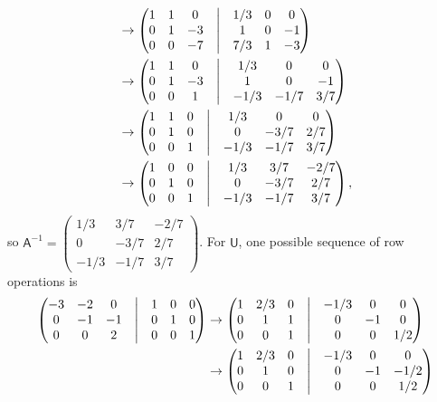 \begin{enumerate}
\begin{enumerate}
\begin{align*}
&\rightarrow \begin{pmatrix} 1 & 1 & 0 & \bigm| & 1/3 & 0 & 0 \\ 0 & 1 & -3 & \bigm| & 1 & 0 & -1 \\ 0 & 0 & -7 & \bigm| & 7/3 & 1 & -3 \end{pmatrix} \\
&\rightarrow \begin{pmatrix} 1 & 1 & 0 & \bigm| & 1/3 & 0 & 0 \\ 0 & 1 & -3 & \bigm| & 1 & 0 & -1 \\ 0 & 0 & 1 & \bigm| & -1/3 & -1/7 & 3/7 \end{pmatrix} \\
&\rightarrow \begin{pmatrix} 1 & 1 & 0 & \bigm| & 1/3 & 0 & 0 \\ 0 & 1 & 0 & \bigm| & 0 & -3/7 & 2/7 \\ 0 & 0 & 1 & \bigm| & -1/3 & -1/7 & 3/7 \end{pmatrix} \\
&\rightarrow \begin{pmatrix} 1 & 0 & 0 & \bigm| & 1/3 & 3/7 & -2/7 \\ 0 & 1 & 0 & \bigm| & 0 & -3/7 & 2/7 \\ 0 & 0 & 1 & \bigm| & -1/3 & -1/7 & 3/7 \end{pmatrix},
\end{align*}
so $\mathsf{A}^{-1} = \begin{pmatrix} 1/3 & 3/7 & -2/7 \\ 0 & -3/7 & 2/7 \\ -1/3 & -1/7 & 3/7 \end{pmatrix}$. For $\mathsf{U}$, one possible sequence of row operations is
\begin{align*}
\begin{pmatrix} -3 & -2 & 0 & \bigm| & 1 & 0 & 0 \\ 0 & -1 & -1 & \bigm| & 0 & 1 & 0 \\ 0 & 0 & 2 & \bigm| & 0 & 0 & 1 \end{pmatrix} &\rightarrow \begin{pmatrix} 1 & 2/3 & 0 & \bigm| & -1/3 & 0 & 0 \\ 0 & 1 & 1 & \bigm| & 0 & -1 & 0 \\ 0 & 0 & 1 & \bigm| & 0 & 0 & 1/2 \end{pmatrix} \\
&\rightarrow \begin{pmatrix} 1 & 2/3 & 0 & \bigm| & -1/3 & 0 & 0 \\ 0 & 1 & 0 & \bigm| & 0 & -1 & -1/2 \\ 0 & 0 & 1 & \bigm| & 0 & 0 & 1/2 \end{pmatrix} \\

\end{align*}
\end{enumerate}
\end{enumerate}
